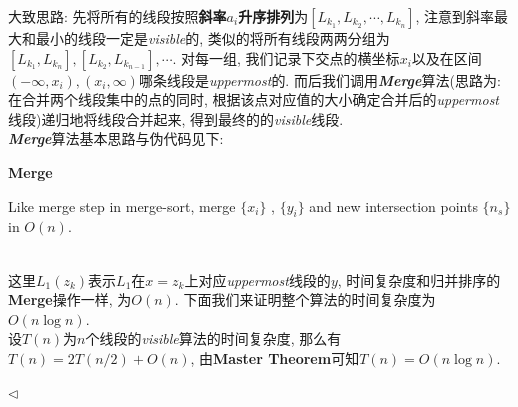 \documentclass[11pt]{article}
\newenvironment{answer}[1][Answer]{\begin{trivlist}
\item[\hskip \labelsep{\bfseries\itshape#1.}\hskip \labelsep]}{\hfill$\lhd$\end{trivlist}}
\begin{document}
\begin{answer}
    大致思路: 先将所有的线段按照\textbf{斜率}$a_i$\textbf{升序排列}为$\left[L_{k_1}, L_{k_2}, \cdots, L_{k_n} \right]$, 注意到斜率最大和最小的线段一定是\textit{visible}的,
    类似的将所有线段两两分组为$\left[L_{k_1}, L_{k_n}\right], \left[L_{k_2}, L_{k_{n-1}}\right], \cdots$. 对每一组, 我们记录下交点的横坐标$x_i$以及在区间$\left(-\infty, x_i\right), \left(x_i, \infty\right)$哪条线段是\textit{uppermost}的.
    而后我们调用\textbf{\textit{Merge}}算法(思路为: 在合并两个线段集中的点的同时, 根据该点对应值的大小确定合并后的\textit{uppermost}线段)递归地将线段合并起来, 得到最终的的\textit{visible}线段. 
    \\ \textbf{\textit{Merge}}算法基本思路与伪代码见下:
    \begin{algorithm}
        \caption{\textbf{Merge}}
        Like merge step in merge-sort, merge $\{x_i\}$ , $\{y_i\}$ and new intersection points $\{n_s\}$ in $O(n)$.\\
    \end{algorithm} \\
    这里$L_1(z_k)$表示$L_1$在$x = z_k$上对应\textit{uppermost}线段的$y$, 时间复杂度和归并排序的\textbf{Merge}操作一样, 为$O(n)$.
    下面我们来证明整个算法的时间复杂度为$O(n \log n)$.\\
    设$T(n)$为$n$个线段的\textit{visible}算法的时间复杂度, 那么有$T(n) = 2T(n/2) + O(n)$, 由\textbf{Master Theorem}可知$T(n) = O(n \log n)$.


\end{answer}
\end{document}
